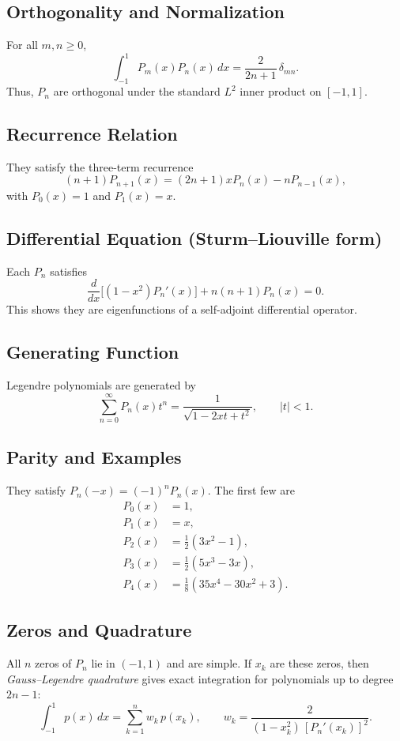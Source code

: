 \documentclass[12pt,a4paper]{article}
\theoremstyle{plain}
\theoremstyle{definition}
\theoremstyle{remark}
\theoremstyle{remark}
\begin{document}
\subsection*{Orthogonality and Normalization}
For all $m,n\ge0$,
\[
\int_{-1}^{1}P_m(x)P_n(x)\,dx=\frac{2}{2n+1}\,\delta_{mn}.
\]
Thus, $P_n$ are orthogonal under the standard $L^2$ inner product on $[-1,1]$.

\subsection*{Recurrence Relation}
They satisfy the three-term recurrence
\[
(n+1)P_{n+1}(x)=(2n+1)xP_n(x)-nP_{n-1}(x),
\]
with $P_0(x)=1$ and $P_1(x)=x$.

\subsection*{Differential Equation (Sturm–Liouville form)}
Each $P_n$ satisfies
\[
\frac{d}{dx}\Big[(1-x^2)P_n'(x)\Big]+n(n+1)P_n(x)=0.
\]
This shows they are eigenfunctions of a self-adjoint differential operator.

\subsection*{Generating Function}
Legendre polynomials are generated by
\[
\sum_{n=0}^{\infty}P_n(x)t^n
=\frac{1}{\sqrt{1-2xt+t^2}},\qquad |t|<1.
\]

\subsection*{Parity and Examples}
They satisfy $P_n(-x)=(-1)^nP_n(x)$.
The first few are
\[
\begin{aligned}
	P_0(x)&=1,\\
	P_1(x)&=x,\\
	P_2(x)&=\tfrac{1}{2}(3x^2-1),\\
	P_3(x)&=\tfrac{1}{2}(5x^3-3x),\\
	P_4(x)&=\tfrac{1}{8}(35x^4-30x^2+3).
\end{aligned}
\]

\subsection*{Zeros and Quadrature}
All $n$ zeros of $P_n$ lie in $(-1,1)$ and are simple.
If $x_k$ are these zeros, then \emph{Gauss–Legendre quadrature} gives exact integration for
polynomials up to degree $2n-1$:
\[
\int_{-1}^{1}p(x)\,dx=\sum_{k=1}^n w_k\,p(x_k),\qquad
w_k=\frac{2}{(1-x_k^2)\,[P_n'(x_k)]^2}.
\]
\end{document}
